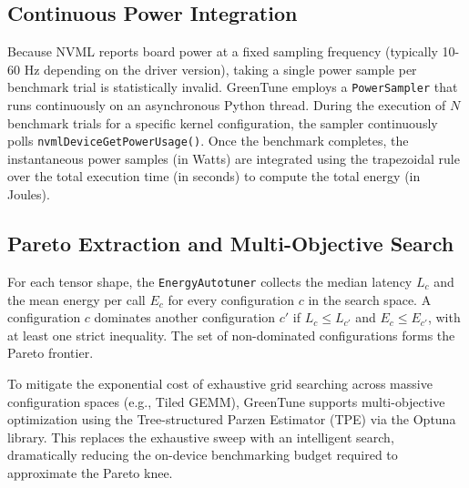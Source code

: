 \subsection{Continuous Power Integration}
Because NVML reports board power at a fixed sampling frequency (typically 10-60 Hz depending on the driver version), taking a single power sample per benchmark trial is statistically invalid. GreenTune employs a \texttt{PowerSampler} that runs continuously on an asynchronous Python thread. During the execution of $N$ benchmark trials for a specific kernel configuration, the sampler continuously polls \texttt{nvmlDeviceGetPowerUsage()}. Once the benchmark completes, the instantaneous power samples (in Watts) are integrated using the trapezoidal rule over the total execution time (in seconds) to compute the total energy (in Joules).

\subsection{Pareto Extraction and Multi-Objective Search}
For each tensor shape, the \texttt{EnergyAutotuner} collects the median latency $L_c$ and the mean energy per call $E_c$ for every configuration $c$ in the search space. A configuration $c$ dominates another configuration $c'$ if $L_c \leq L_{c'}$ and $E_c \leq E_{c'}$, with at least one strict inequality. The set of non-dominated configurations forms the Pareto frontier.

To mitigate the exponential cost of exhaustive grid searching across massive configuration spaces (e.g., Tiled GEMM), GreenTune supports multi-objective optimization using the Tree-structured Parzen Estimator (TPE) via the Optuna library. This replaces the exhaustive sweep with an intelligent search, dramatically reducing the on-device benchmarking budget required to approximate the Pareto knee.
